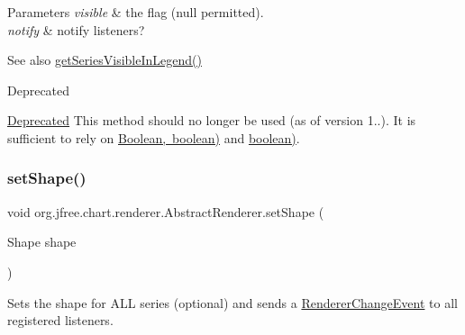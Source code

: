 \begin{DoxyParams}{Parameters}
{\em visible} & the flag ({\ttfamily null} permitted). \\
\hline
{\em notify} & notify listeners?\\
\hline
\end{DoxyParams}
\begin{DoxySeeAlso}{See also}
\mbox{\hyperlink{classorg_1_1jfree_1_1chart_1_1renderer_1_1_abstract_renderer_afa4d326cb72c09bce35c28534efd7ec0}{get\+Series\+Visible\+In\+Legend()}}
\end{DoxySeeAlso}
\begin{DoxyRefDesc}{Deprecated}
\item[\mbox{\hyperlink{deprecated__deprecated000115}{Deprecated}}]This method should no longer be used (as of version 1..). It is sufficient to rely on \mbox{\hyperlink{}{Boolean, boolean)}} and \mbox{\hyperlink{classorg_1_1jfree_1_1chart_1_1renderer_1_1_abstract_renderer_a9e6708a1410b3575666ecd84f2151f7c}{boolean)}}. \end{DoxyRefDesc}
\mbox{\label{classorg_1_1jfree_1_1chart_1_1renderer_1_1_abstract_renderer_a21366bf2996bed80af19ed88a66cc11f}} 
\subsubsection{\texorpdfstring{set\+Shape()}{setShape()}\hspace{0.1cm}{\footnotesize\ttfamily [1/2]}}
{\footnotesize\ttfamily void org.\+jfree.\+chart.\+renderer.\+Abstract\+Renderer.\+set\+Shape (\begin{DoxyParamCaption}\item[{Shape}]{shape }\end{DoxyParamCaption})}

Sets the shape for A\+LL series (optional) and sends a \mbox{\hyperlink{}{Renderer\+Change\+Event}} to all registered listeners.



